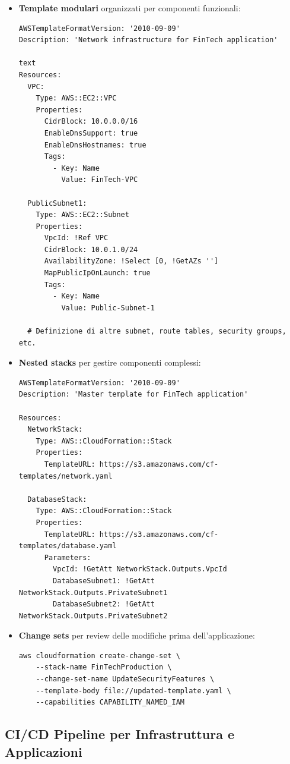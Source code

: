\documentclass[a4paper,12pt]{report}
\begin{document}
\begin{itemize}
\item \textbf{Template modulari} organizzati per componenti funzionali:
\begin{verbatim}
AWSTemplateFormatVersion: '2010-09-09'
Description: 'Network infrastructure for FinTech application'

text
Resources:
  VPC:
    Type: AWS::EC2::VPC
    Properties:
      CidrBlock: 10.0.0.0/16
      EnableDnsSupport: true
      EnableDnsHostnames: true
      Tags:
        - Key: Name
          Value: FinTech-VPC

  PublicSubnet1:
    Type: AWS::EC2::Subnet
    Properties:
      VpcId: !Ref VPC
      CidrBlock: 10.0.1.0/24
      AvailabilityZone: !Select [0, !GetAZs '']
      MapPublicIpOnLaunch: true
      Tags:
        - Key: Name
          Value: Public-Subnet-1

  # Definizione di altre subnet, route tables, security groups, etc.
\end{verbatim}

\item \textbf{Nested stacks} per gestire componenti complessi:
\begin{verbatim}
AWSTemplateFormatVersion: '2010-09-09'
Description: 'Master template for FinTech application'

Resources:
  NetworkStack:
    Type: AWS::CloudFormation::Stack
    Properties:
      TemplateURL: https://s3.amazonaws.com/cf-templates/network.yaml

  DatabaseStack:
    Type: AWS::CloudFormation::Stack
    Properties:
      TemplateURL: https://s3.amazonaws.com/cf-templates/database.yaml
      Parameters:
        VpcId: !GetAtt NetworkStack.Outputs.VpcId
        DatabaseSubnet1: !GetAtt NetworkStack.Outputs.PrivateSubnet1
        DatabaseSubnet2: !GetAtt NetworkStack.Outputs.PrivateSubnet2
\end{verbatim}

\item \textbf{Change sets} per review delle modifiche prima dell'applicazione:
\begin{verbatim}
aws cloudformation create-change-set \
    --stack-name FinTechProduction \
    --change-set-name UpdateSecurityFeatures \
    --template-body file://updated-template.yaml \
    --capabilities CAPABILITY_NAMED_IAM
\end{verbatim}
\end{itemize}

\subsection{CI/CD Pipeline per Infrastruttura e Applicazioni}
\end{document}
